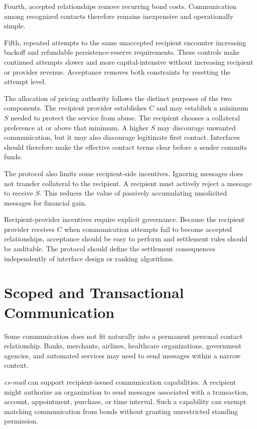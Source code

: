 \documentclass[11pt]{article}
\begin{document}
Fourth, accepted relationships remove recurring bond costs. Communication among recognized contacts therefore remains inexpensive and operationally simple.

Fifth, repeated attempts to the same unaccepted recipient encounter increasing backoff and refundable persistence-reserve requirements. These controls make continued attempts slower and more capital-intensive without increasing recipient or provider revenue. Acceptance removes both constraints by resetting the attempt level.

The allocation of pricing authority follows the distinct purposes of the two components. The recipient provider establishes $C$ and may establish a minimum $S$ needed to protect the service from abuse. The recipient chooses a collateral preference at or above that minimum. A higher $S$ may discourage unwanted communication, but it may also discourage legitimate first contact. Interfaces should therefore make the effective contact terms clear before a sender commits funds.

The protocol also limits some recipient-side incentives. Ignoring messages does not transfer collateral to the recipient. A recipient must actively reject a message to receive $S$. This reduces the value of passively accumulating unsolicited messages for financial gain.

Recipient-provider incentives require explicit governance. Because the recipient provider receives $C$ when communication attempts fail to become accepted relationships, acceptance should be easy to perform and settlement rules should be auditable. The protocol should define the settlement consequences independently of interface design or ranking algorithms.

\section{Scoped and Transactional Communication}

Some communication does not fit naturally into a permanent personal contact relationship. Banks, merchants, airlines, healthcare organizations, government agencies, and automated services may need to send messages within a narrow context.

\textit{cs-mail} can support recipient-issued communication capabilities. A recipient might authorize an organization to send messages associated with a transaction, account, appointment, purchase, or time interval. Such a capability can exempt matching communication from bonds without granting unrestricted standing permission.
\end{document}
